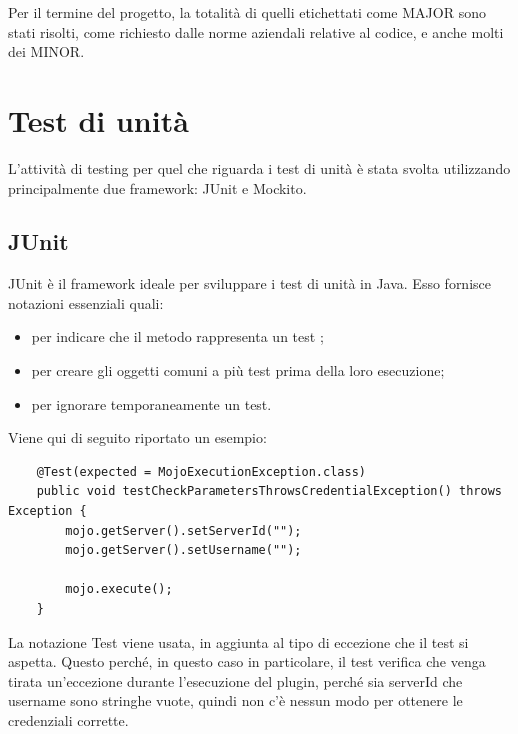 Per il termine del progetto, la totalità di quelli etichettati come MAJOR sono stati risolti, come richiesto dalle norme aziendali relative al codice, e anche molti dei MINOR.
 

\section{Test di unità}

L'attività di testing per quel che riguarda i test di unità è stata svolta utilizzando principalmente due framework: JUnit e Mockito.

    \subsection{JUnit}
    JUnit è il framework ideale per sviluppare i test di unità in Java.
    Esso fornisce notazioni \cite{site:junit-annotation} essenziali quali:
    \begin{itemize}
        \item {} per indicare che il metodo rappresenta un test \cite{site:junit-test};
        \item {} per creare gli oggetti comuni a più test prima della loro esecuzione;
        \item {} per ignorare temporaneamente un test.
    \end{itemize}
    
    Viene qui di seguito riportato un esempio:
    \begin{lstlisting} 
    @Test(expected = MojoExecutionException.class)
    public void testCheckParametersThrowsCredentialException() throws Exception {
        mojo.getServer().setServerId("");
        mojo.getServer().setUsername("");

        mojo.execute();
    }
    \end{lstlisting}
    La notazione Test viene usata, in aggiunta al tipo di eccezione che il test si aspetta.
    Questo perché, in questo caso in particolare, il test verifica che venga tirata un'eccezione durante l'esecuzione del plugin, perché sia serverId che username sono stringhe vuote, quindi non c'è nessun modo per ottenere le credenziali corrette. \\

